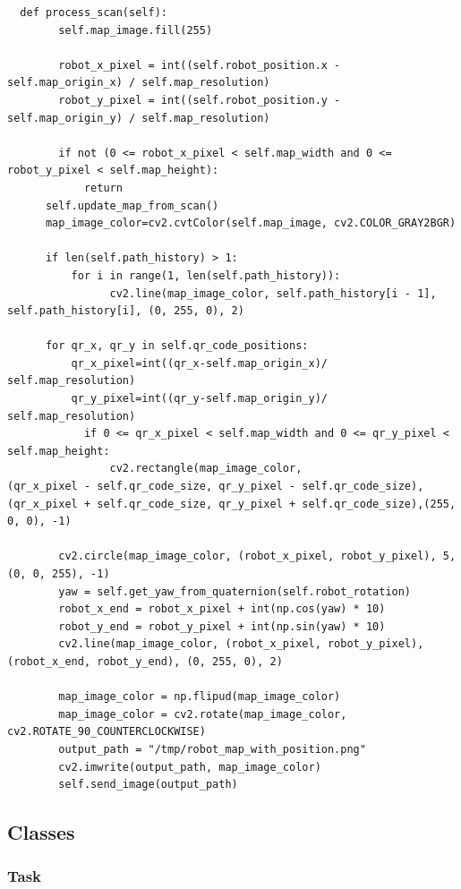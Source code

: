 \documentclass[a4paper,12pt]{extreport}
\begin{document}
  \begin{verbatim}
  def process_scan(self):
        self.map_image.fill(255)  

        robot_x_pixel = int((self.robot_position.x - self.map_origin_x) / self.map_resolution)
        robot_y_pixel = int((self.robot_position.y - self.map_origin_y) / self.map_resolution)

        if not (0 <= robot_x_pixel < self.map_width and 0 <= robot_y_pixel < self.map_height):
            return
      self.update_map_from_scan()
      map_image_color=cv2.cvtColor(self.map_image, cv2.COLOR_GRAY2BGR)

      if len(self.path_history) > 1:
          for i in range(1, len(self.path_history)):
                cv2.line(map_image_color, self.path_history[i - 1], self.path_history[i], (0, 255, 0), 2)

      for qr_x, qr_y in self.qr_code_positions:
          qr_x_pixel=int((qr_x-self.map_origin_x)/ self.map_resolution)
          qr_y_pixel=int((qr_y-self.map_origin_y)/ self.map_resolution)
            if 0 <= qr_x_pixel < self.map_width and 0 <= qr_y_pixel < self.map_height:
                cv2.rectangle(map_image_color,
(qr_x_pixel - self.qr_code_size, qr_y_pixel - self.qr_code_size),(qr_x_pixel + self.qr_code_size, qr_y_pixel + self.qr_code_size),(255, 0, 0), -1)

        cv2.circle(map_image_color, (robot_x_pixel, robot_y_pixel), 5, (0, 0, 255), -1)
        yaw = self.get_yaw_from_quaternion(self.robot_rotation)
        robot_x_end = robot_x_pixel + int(np.cos(yaw) * 10)
        robot_y_end = robot_y_pixel + int(np.sin(yaw) * 10)
        cv2.line(map_image_color, (robot_x_pixel, robot_y_pixel), (robot_x_end, robot_y_end), (0, 255, 0), 2)

        map_image_color = np.flipud(map_image_color)
        map_image_color = cv2.rotate(map_image_color, cv2.ROTATE_90_COUNTERCLOCKWISE)
        output_path = "/tmp/robot_map_with_position.png"
        cv2.imwrite(output_path, map_image_color)
        self.send_image(output_path)
\end{verbatim}
\label{judeFig24}

\subsection{Classes}

\subsubsection{Task}
\end{document}
